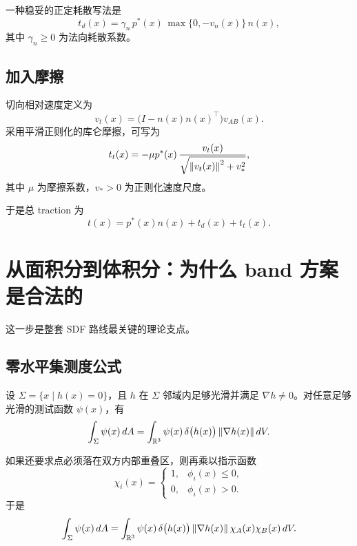 \documentclass[12pt,a4paper]{ctexart}
\begin{document}
一种稳妥的正定耗散写法是
\begin{equation}
    t_d(x)=\gamma_n\,p^*(x)\,\max\{0,-v_n(x)\}\,n(x),
\end{equation}
其中 $\gamma_n\ge 0$ 为法向耗散系数。

\subsection{加入摩擦}
切向相对速度定义为
\begin{equation}
    v_t(x)=\bigl(I-n(x)n(x)^\top\bigr)v_{AB}(x).
\end{equation}
采用平滑正则化的库仑摩擦，可写为
\begin{equation}
    t_t(x)= -\mu p^*(x)\,\frac{v_t(x)}{\sqrt{\norm{v_t(x)}^2+v_*^2}},
\end{equation}
其中 $\mu$ 为摩擦系数，$v_*>0$ 为正则化速度尺度。

于是总 traction 为
\begin{equation}
    t(x)=p^*(x)n(x)+t_d(x)+t_t(x).
\end{equation}

\section{从面积分到体积分：为什么 band 方案是合法的}

这一步是整套 SDF 路线最关键的理论支点。

\subsection{零水平集测度公式}
设 $\Sigma=\{x\mid h(x)=0\}$，且 $h$ 在 $\Sigma$ 邻域内足够光滑并满足 $\nabla h\neq 0$。对任意足够光滑的测试函数 $\psi(x)$，有
\begin{equation}
    \int_{\Sigma} \psi(x)\,dA
    =
    \int_{\mathbb R^3}
    \psi(x)\,\delta\bigl(h(x)\bigr)\,\norm{\nabla h(x)}\,dV.
\end{equation}

如果还要求点必须落在双方内部重叠区，则再乘以指示函数
\begin{equation}
    \chi_i(x)=
    \begin{cases}
        1,& \phi_i(x)\le 0,\\
        0,& \phi_i(x)>0.
    \end{cases}
\end{equation}
于是
\begin{equation}
    \int_{\Sigma}\psi(x)\,dA
    =
    \int_{\mathbb R^3}
    \psi(x)\,\delta\bigl(h(x)\bigr)\,\norm{\nabla h(x)}\,\chi_A(x)\chi_B(x)\,dV.
\end{equation}
\end{document}
